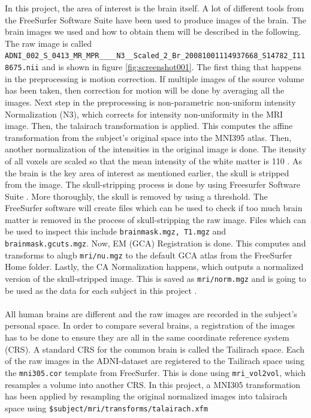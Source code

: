 \documentclass[12pt, fleqn, titlepage]{article}
\begin{document}
In this project, the area of interest is the brain itself. A lot of different tools from the FreeSurfer Software Suite have been used to produce images of the brain. The brain images we used and how to obtain them will be described in the following. The raw image is called \newline \texttt{
ADNI\_002\_S\_0413\_MR\_MPR\_\_\_\_N3\_\_Scaled\_2\_Br\_20081001114937668\_S14782\_I118675.nii} and is shown in figure \ref{fig:screenshot001}. The first thing that happens in the preprocessing is motion correction. If multiple images of the source volume has been taken, then correction for motion will be done by averaging all the images.
Next step in the preprocessing is non-parametric non-uniform intensity Normalization (N3), which corrects for intensity non-uniformity in the MRI image.
Then, the talairach transformation is applied. This computes the affine transformation from the subject's original space into the MNI395 atlas.
Then, another normalization of the intensities in the original image is done. The itensity of all voxels are scaled so that the mean intensity of the white matter is 110 \cite{normalize}. 
As the brain is the key area of interest as mentioned earlier, the skull is stripped from the image. The skull-stripping process is done by using Freesurfer Software Suite \cite{freesurfer}.
More thoroughly, the skull is removed by using a threshold.
The FreeSurfer software will create files which can be used to check if too much brain matter is removed in the process of skull-stripping the raw image.
Files which can be used to inspect this include \texttt{brainmask.mgz, T1.mgz} and \texttt{brainmask.gcuts.mgz}.
Now, EM (GCA) Registration is done. This computes and transforms to alugb %
\texttt{mri/nu.mgz} to the default GCA atlas from the FreeSurfer Home folder. Lastly, the CA Normalization happens, which outputs a normalized version of the skull-stripped image. This is saved as \texttt{mri/norm.mgz} and is going to be used as the data for each subject in this project \cite{reckon}.
\\\\
All human brains are different and the raw images are recorded in the subject's personal space. 
In order to compare several brains, a registration of the images has to be done to ensure they are all in the same coordinate reference system (CRS). 
A standard CRS for the common brain is called the Tailirach space. 
Each of the raw images in the ADNI-dataset are registered to the Tailirach space using the \texttt{mni305.cor} template from FreeSurfer. 
This is done using \texttt{mri\_vol2vol}, which resamples a volume into another CRS. 
In this project, a MNI305 transformation has been applied by resampling the original normalized images into talairach space using \texttt{\$subject/mri/transforms/talairach.xfm} %
\end{document}
